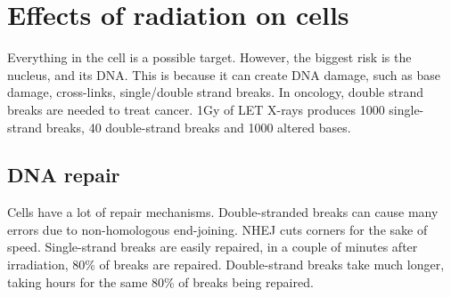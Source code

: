 \section{Effects of radiation on cells}
Everything in the cell is a possible target. However, the biggest risk is the nucleus, and its DNA. This is because it can create DNA damage, such as base damage, cross-links, single/double strand breaks. In oncology, double strand breaks are needed to treat cancer. 1Gy of LET X-rays produces 1000 single-strand breaks, 40 double-strand breaks and 1000 altered bases.

\subsection{DNA repair}
Cells have a lot of repair mechanisms. Double-stranded breaks can cause many errors due to non-homologous end-joining. NHEJ cuts corners for the sake of speed. Single-strand breaks are easily repaired, in a couple of minutes after irradiation, 80\% of breaks are repaired. Double-strand breaks take much longer, taking hours for the same 80\% of breaks being repaired. 

